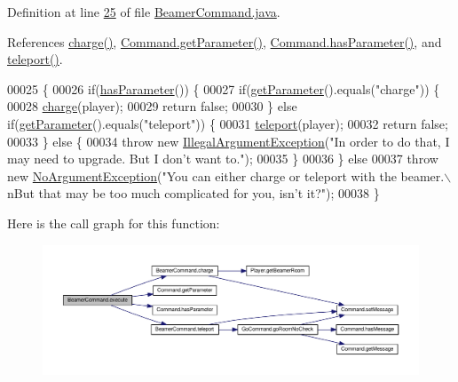 Definition at line \hyperlink{BeamerCommand_8java_source_l00025}{25} of file \hyperlink{BeamerCommand_8java_source}{Beamer\-Command.\-java}.



References \hyperlink{BeamerCommand_8java_source_l00062}{charge()}, \hyperlink{Command_8java_source_l00025}{Command.\-get\-Parameter()}, \hyperlink{Command_8java_source_l00041}{Command.\-has\-Parameter()}, and \hyperlink{BeamerCommand_8java_source_l00045}{teleport()}.


\begin{DoxyCode}
00025                                                                                                            
               \{
00026         \textcolor{keywordflow}{if}(\hyperlink{classCommand_a9b042558156d6749566e0fd9d48d3bfe}{hasParameter}()) \{
00027             \textcolor{keywordflow}{if}(\hyperlink{classCommand_a1ced3739d546770ba1389e6ce228255e}{getParameter}().equals(\textcolor{stringliteral}{"charge"})) \{
00028                 \hyperlink{classBeamerCommand_a130a572b2ec0532c92ea5033a098b1ac}{charge}(player);
00029                 \textcolor{keywordflow}{return} \textcolor{keyword}{false};
00030             \} \textcolor{keywordflow}{else} \textcolor{keywordflow}{if}(\hyperlink{classCommand_a1ced3739d546770ba1389e6ce228255e}{getParameter}().equals(\textcolor{stringliteral}{"teleport"})) \{
00031                 \hyperlink{classBeamerCommand_a1f19366fb8b873959f72f38d49d5b178}{teleport}(player);
00032                 \textcolor{keywordflow}{return} \textcolor{keyword}{false};
00033             \} \textcolor{keywordflow}{else} \{
00034                 \textcolor{keywordflow}{throw} \textcolor{keyword}{new} \hyperlink{classIllegalArgumentException}{IllegalArgumentException}(\textcolor{stringliteral}{"In order to do that, I may need
       to upgrade. But I don't want to."});
00035             \}
00036         \} \textcolor{keywordflow}{else} 
00037             \textcolor{keywordflow}{throw} \textcolor{keyword}{new} \hyperlink{classNoArgumentException}{NoArgumentException}(\textcolor{stringliteral}{"You can either charge or teleport with the
       beamer.\(\backslash\)nBut that may be too much complicated for you, isn't it?"});
00038     \}
\end{DoxyCode}


Here is the call graph for this function\-:
\nopagebreak
\begin{figure}[H]
\begin{center}
\leavevmode
\includegraphics[width=350pt]{classBeamerCommand_ab28a7d743569841e463b2c0c65cf6eb1_cgraph}
\end{center}
\end{figure}


